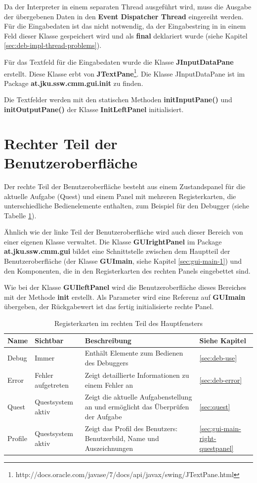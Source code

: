 Da der Interpreter in einem separaten Thread ausgeführt wird, muss die Ausgabe der übergebenen Daten in den \textbf{Event Dispatcher Thread} eingereiht werden. Für die Eingabedaten ist das nicht notwendig, da der Eingabestring in in einem Feld dieser Klasse gespeichert wird und als \textbf{final} deklariert wurde (siehe Kapitel \ref{sec:deb-impl-thread-problems}).

Für das Textfeld für die Eingabedaten wurde die Klasse \textbf{JInputDataPane} erstellt. Diese Klasse erbt von \textbf{JTextPane}\footnote{http://docs.oracle.com/javase/7/docs/api/javax/swing/JTextPane.html}. Die Klasse JInputDataPane ist im Package \textbf{at.jku.ssw.cmm.gui.init} zu finden. 

Die Textfelder werden mit den statischen Methoden \textbf{initInputPane()} und \textbf{initOutputPane()} der Klasse \textbf{InitLeftPanel} initialisiert.

\section{Rechter Teil der Benutzeroberfläche}
Der rechte Teil der Benutzeroberfläche besteht aus einem Zustandspanel für die aktuelle Aufgabe (Quest) und einem Panel mit mehreren Registerkarten, die unterschiedliche Bedienelemente enthalten, zum Beispiel für den Debugger (siehe Tabelle \ref{tab:gui-main-right-reg}).

Ähnlich wie der linke Teil der Benutzeroberfläche wird auch dieser Bereich von einer eigenen Klasse verwaltet. Die Klasse \textbf{GUIrightPanel} im Package \textbf{at.jku.ssw.cmm.gui} bildet eine Schnittstelle zwischen dem Hauptteil der Benutzeroberfläche (der Klasse \textbf{GUImain}, siehe Kapitel \ref{sec:gui-main-1}) und den Komponenten, die in den Registerkarten des rechten Panels eingebettet sind.

Wie bei der Klasse \textbf{GUIleftPanel} wird die Benutzeroberfläche dieses Bereiches mit der Methode \textbf{init} erstellt. Als Parameter wird eine Referenz auf \textbf{GUImain} übergeben, der Rückgabewert ist das fertig initialisierte rechte Panel.

\def\arraystretch{1.6}
\begin{table}[h!]
\begin{tabular}{|l|p{2.5cm}|p{6.6cm}|l|}
\hline
\textbf{Name}&\textbf{Sichtbar}&\textbf{Beschreibung}&\textbf{Siehe Kapitel}\\
\hline
Debug&Immer&Enthält Elemente zum Bedienen des Debuggers&\ref{sec:deb-use}\\
Error&Fehler aufgetreten&Zeigt detaillierte Informationen zu einem Fehler an&\ref{sec:deb-error}\\
Quest&Questsystem aktiv&Zeigt die aktuelle Aufgabenstellung an und ermöglicht das Überprüfen der Aufgabe&\ref{sec:quest}\\
Profile&Questsystem aktiv&Zeigt das Profil des Benutzers: Benutzerbild, Name und Auszeichnungen&\ref{sec:gui-main-right-questpanel}\\
\hline
\end{tabular}
\caption{Registerkarten im rechten Teil des Hauptfensters}\label{tab:gui-main-right-reg}
\end{table}

